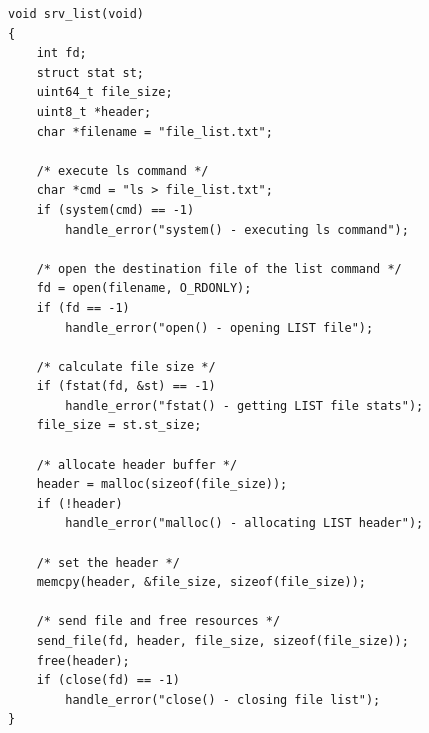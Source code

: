 \begin{lstlisting}[title=srvcmd.c]
void srv_list(void)
{
    int fd;
    struct stat st;
    uint64_t file_size;
    uint8_t *header;
    char *filename = "file_list.txt";

    /* execute ls command */
    char *cmd = "ls > file_list.txt";
    if (system(cmd) == -1)
        handle_error("system() - executing ls command");

    /* open the destination file of the list command */
    fd = open(filename, O_RDONLY);
    if (fd == -1)
        handle_error("open() - opening LIST file");

    /* calculate file size */
    if (fstat(fd, &st) == -1)
        handle_error("fstat() - getting LIST file stats");
    file_size = st.st_size;

    /* allocate header buffer */
    header = malloc(sizeof(file_size));
    if (!header)
        handle_error("malloc() - allocating LIST header");

    /* set the header */
    memcpy(header, &file_size, sizeof(file_size));

    /* send file and free resources */
    send_file(fd, header, file_size, sizeof(file_size));
    free(header);
    if (close(fd) == -1)
        handle_error("close() - closing file list");
}
\end{lstlisting}
